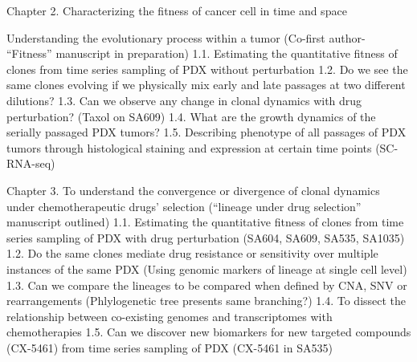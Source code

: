 Chapter 2. Characterizing the fitness of cancer cell in time and space

Understanding the evolutionary process within a tumor (Co-first author- “Fitness” manuscript in preparation)
1.1. Estimating the quantitative fitness of clones from time series sampling of PDX without perturbation
1.2. Do we see the same clones evolving if we physically mix early and late passages at two different dilutions?
1.3. Can we observe any change in clonal dynamics with drug perturbation? (Taxol on SA609)
1.4. What are the growth dynamics of the serially passaged PDX tumors?
1.5. Describing phenotype of all passages of PDX tumors through histological staining and expression at certain time points (SC-RNA-seq) 

Chapter 3. To understand the convergence or divergence of clonal dynamics under chemotherapeutic drugs’ selection (“lineage under drug selection” manuscript outlined)
1.1. Estimating the quantitative fitness of clones from time series sampling of PDX with drug perturbation (SA604, SA609, SA535, SA1035)
1.2.  Do the same clones mediate drug resistance or sensitivity over multiple instances of the same PDX (Using genomic markers of lineage at single cell level)
1.3. Can we compare the lineages to be compared when defined by CNA, SNV or rearrangements (Phlylogenetic tree presents same branching?) 	
1.4. To dissect the relationship between co-existing genomes and transcriptomes with chemotherapies
1.5. Can we discover new biomarkers for new targeted compounds (CX-5461) from time series sampling of PDX (CX-5461 in SA535) 

